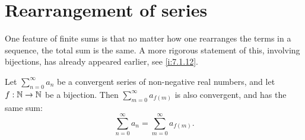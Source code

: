 \section{Rearrangement of series}\label{i:sec:7.4}

\begin{note}
  One feature of finite sums is that no matter how one rearranges the terms in a sequence, the total sum is the same.
  A more rigorous statement of this, involving bijections, has already appeared earlier, see \cref{i:7.1.12}.
\end{note}

\begin{prop}\label{i:7.4.1}
  Let \(\sum_{n = 0}^\infty a_n\) be a convergent series of non-negative real numbers, and let \(f : \mathbb{N} \to \mathbb{N}\) be a bijection.
  Then \(\sum_{m = 0}^\infty a_{f(m)}\) is also convergent, and has the same sum:
  \[
    \sum_{n = 0}^\infty a_n = \sum_{m = 0}^\infty a_{f(m)}.
  \]
\end{prop}

